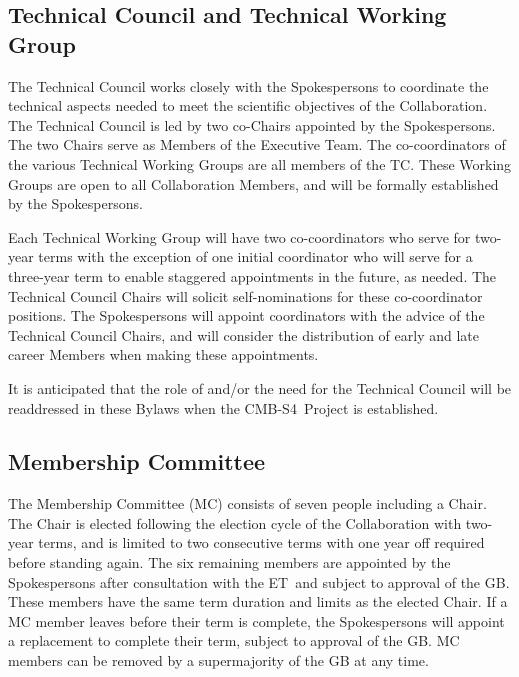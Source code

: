 \documentclass[12pt]{article}
\newcommand{\exec}{{Executive Team}}
\newcommand{\shorte}{{ET}}  %
\newcommand\collabname{CMB-S4}
\begin{document}
\subsection{Technical Council and Technical Working Group}
The Technical Council works closely with the Spokespersons to coordinate the technical aspects needed to meet the scientific objectives of the Collaboration.  The Technical Council is led by two co-Chairs appointed by the Spokespersons.  The two Chairs serve as Members of the \exec.   The co-coordinators of the various Technical Working Groups are all members of the TC.   These Working Groups are open to all Collaboration Members, and will be formally established by the Spokespersons.   

Each Technical Working Group will have two co-coordinators who serve for two-year terms with the exception of one initial coordinator who will serve for a three-year term to enable staggered appointments in the future, as needed.  The Technical Council Chairs will solicit self-nominations for these co-coordinator positions. The Spokespersons will appoint coordinators with the advice of the Technical Council Chairs, and will consider the distribution of early and late career Members when making these appointments.

It is anticipated that the role of and/or the need for the Technical Council will be readdressed in these Bylaws when the \collabname\ Project is established.

\subsection{Membership Committee}

The Membership Committee (MC) consists of seven people including a Chair. The Chair is elected following the election cycle of the Collaboration with  two-year terms, and is limited to two consecutive terms with one year off required before standing again. \textcolor{\markcolor}{The six remaining members are appointed by the Spokespersons after consultation with the \shorte\ and subject to approval of the GB. %
These members have the same term duration and limits as the elected Chair.} If a MC member leaves before their term is complete,  \textcolor{\markcolor}{the Spokespersons %
will appoint a replacement to complete their term, subject to approval of the GB.}   MC members can be removed by a supermajority of the GB at any time.  
\end{document}
